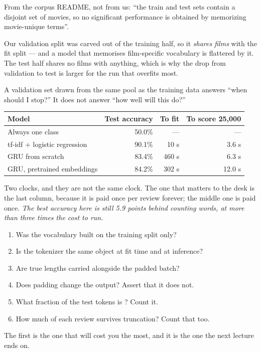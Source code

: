 \documentclass[11pt,a4paper]{article}
\begin{document}
\begin{failbox}[title={Failure condition --- a warning about that validation set}]
From the corpus README, not from us: ``the train and test sets contain a
disjoint set of movies, so no significant performance is obtained by memorizing
movie-unique terms''.

Our validation split was carved out of the training half, so it \emph{shares
films} with the fit split --- and a model that memorises film-specific
vocabulary is flattered by it. The test half shares no films with anything,
which is why the drop from validation to test is larger for the run that
overfits most.

A validation set drawn from the same pool as the training data answers ``when
should I stop?'' It does not answer ``how well will this do?''
\end{failbox}

\begin{center}
\small
\begin{tabular}{lrrr}
\toprule
\textbf{Model} & \textbf{Test accuracy} & \textbf{To fit} &
\textbf{To score 25{,}000} \\
\midrule
Always one class & 50.0\% & --- & --- \\
tf-idf + logistic regression & 90.1\% & 10 s & 3.6 s \\
GRU from scratch & 83.4\% & 460 s & 6.3 s \\
GRU, pretrained embeddings & 84.2\% & 302 s & 12.0 s \\
\bottomrule
\end{tabular}
\end{center}

Two clocks, and they are not the same clock. The one that matters to the desk
is the last column, because it is paid once per review forever; the middle one
is paid once. \emph{The best accuracy here is still 5.9 points behind counting
words, at more than three times the cost to run.}

\begin{keybox}[title={Text checklist}]
\begin{enumerate}[leftmargin=1.6em,itemsep=1pt]
  \item Was the vocabulary built on the training split only?
  \item Is the tokenizer the same object at fit time and at inference?
  \item Are true lengths carried alongside the padded batch?
  \item Does padding change the output? Assert that it does not.
  \item What fraction of the test tokens is \code{[UNK]}? Count it.
  \item How much of each review survives truncation? Count that too.
\end{enumerate}
The first is the one that will cost you the most, and it is the one the next
lecture ends on.
\end{keybox}
\end{document}
